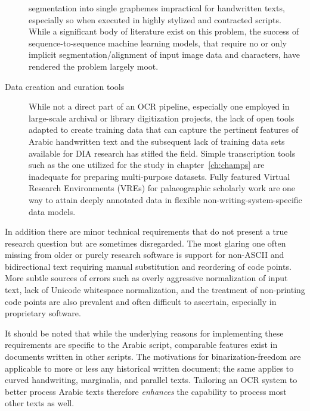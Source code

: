 \begin{description}
		segmentation into single graphemes impractical for handwritten
		texts, especially so when executed in highly stylized and
		contracted scripts. While a significant body of literature
		exist on this problem, the success of sequence-to-sequence
		machine learning models, that require no or only implicit
		segmentation/alignment of input image data and characters, have
		rendered the problem largely moot.
	\item[Data creation and curation tools] While not a direct part of an
		OCR pipeline, especially one employed in large-scale archival
		or library digitization projects, the lack of open tools
		adapted to create training data that can capture the pertinent
		features of Arabic handwritten text and the subsequent lack of
		training data sets available for DIA research has stifled the
		field. Simple transcription tools such as the one utilized for
		the study in chapter~\ref{ch:champs} are inadequate for
		preparing multi-purpose datasets. Fully featured Virtual
		Research Environments (VREs) for palaeographic scholarly work
		are one way to attain deeply annotated data in flexible
		non-writing-system-specific data models.
\end{description}

In addition there are minor technical requirements that do not present a true
research question but are sometimes disregarded. The most glaring one often
missing from older or purely research software is support for non-ASCII and
bidirectional text requiring manual substitution and reordering of code points.
More subtle sources of errors such as overly aggressive normalization of input
text, lack of Unicode whitespace normalization, and the treatment of
non-printing code points are also prevalent and often difficult to ascertain,
especially in proprietary software. 

It should be noted that while the underlying reasons for implementing these
requirements are specific to the Arabic script, comparable features exist in
documents written in other scripts. The motivations for binarization-freedom
are applicable to more or less any historical written document; the same
applies to curved handwriting, marginalia, and parallel texts. Tailoring an OCR
system to better process Arabic texts therefore \emph{enhances} the capability
to process most other texts as well.
